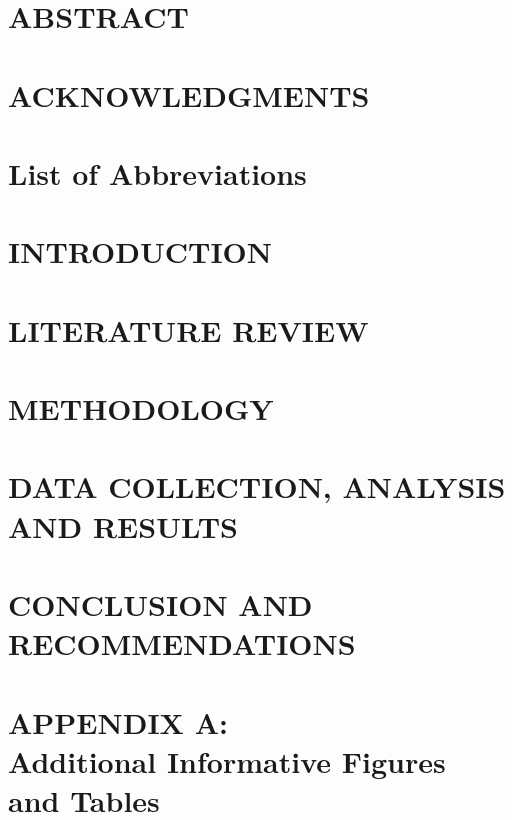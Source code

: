 \documentclass[12pt,oneside]{book}
\begin{document}
\frontmatter



\renewcommand{\arraystretch}{1.3}
\renewcommand{\baselinestretch}{0}

\chapter*{ABSTRACT}


\chapter*{ACKNOWLEDGMENTS}


\tableofcontents

\chapter*{List of Abbreviations}


\mainmatter

\chapter{INTRODUCTION}


\chapter{LITERATURE REVIEW}


\chapter{METHODOLOGY}


\chapter{DATA COLLECTION, ANALYSIS AND RESULTS}


\chapter{CONCLUSION AND RECOMMENDATIONS}


\backmatter

\renewcommand{\bibname}{REFERENCES}


\pagestyle{plain}

\chapter*{ {APPENDIX A:} \\ {Additional Informative Figures} \\ {and Tables} }

\end{document}
